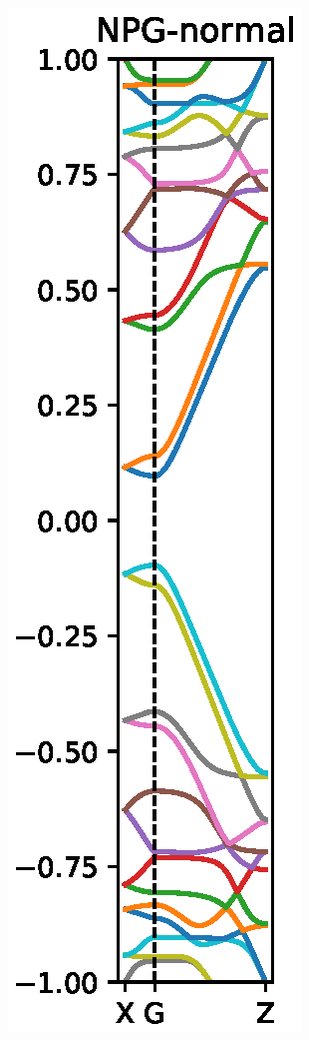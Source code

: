 \begin{figure}
    \centering
    \begin{subfigure}[b]{0.3\textwidth}
        \includegraphics[width=\textwidth]{Figures/name/FabNPGBS.eps}

\end{subfigure}
\end{figure}
